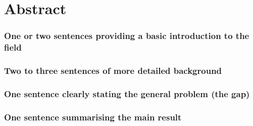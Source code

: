 \clearpage





\begin{knitrout}\footnotesize
{}\color{fgcolor}\begin{kframe}
\begin{alltt}



\end{alltt}
\end{kframe}
\end{knitrout}

\section{Abstract}


\subsubsection{One or two sentences providing a basic introduction to the field}



\subsubsection{Two to three sentences of more detailed background}


\subsubsection{One sentence clearly stating the general problem (the gap)}


\subsubsection{One sentence summarising the main result}


